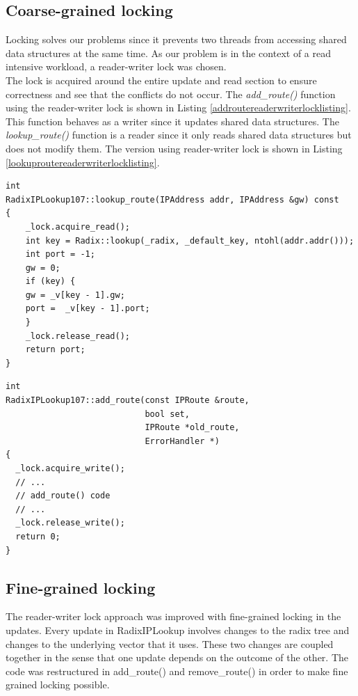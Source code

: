 \documentclass{article}
\begin{document}
\subsection{Coarse-grained locking}
Locking solves our problems since it prevents two threads from accessing shared data structures at the same time. As our problem is in the context of a read intensive workload, a reader-writer lock was chosen.
\\ The lock is acquired around the entire update and read section to ensure correctness and see that the conflicts do not occur. The \emph{add\_route()} function using the reader-writer lock is shown in Listing \ref{addroutereaderwriterlocklisting}. This function behaves as a writer since it updates shared data structures. The \emph{lookup\_route()} function is a reader since it only reads shared data structures but does not modify them. The version using reader-writer lock is shown in Listing \ref{lookuproutereaderwriterlocklisting}.
\begin{lstlisting}[caption = Reader-writer lock usage in lookup\_route(), label=lookuproutereaderwriterlocklisting]
int
RadixIPLookup107::lookup_route(IPAddress addr, IPAddress &gw) const
{  
    _lock.acquire_read();
    int key = Radix::lookup(_radix, _default_key, ntohl(addr.addr()));
    int port = -1;
    gw = 0;    
    if (key) {
	gw = _v[key - 1].gw;
	port =  _v[key - 1].port;
    }
    _lock.release_read();
    return port;
}
\end{lstlisting}

\begin{lstlisting}[caption = Reader-writer lock usage in add\_route(), label=addroutereaderwriterlocklisting]
int
RadixIPLookup107::add_route(const IPRoute &route, 
                            bool set, 
                            IPRoute *old_route, 
                            ErrorHandler *)
{
  _lock.acquire_write();
  // ...
  // add_route() code
  // ...
  _lock.release_write();
  return 0;
}
\end{lstlisting}

\subsection{Fine-grained locking}
The reader-writer lock approach was improved with fine-grained locking in the updates. Every update in RadixIPLookup involves changes to the radix tree and changes to the underlying vector that it uses. These two changes are coupled together in the sense that one update depends on the outcome of the other. The code was restructured in add\_route() and remove\_route() in order to make fine grained locking possible.
\end{document}
